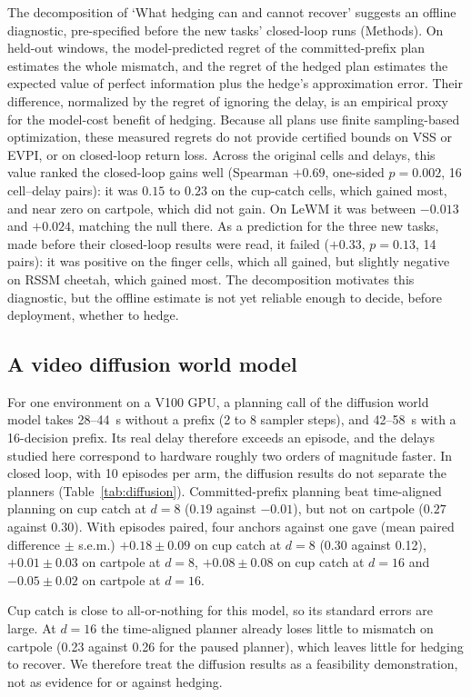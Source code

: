 \documentclass[aps,physrev,\manuscriptlayout,superscriptaddress,
  longbibliography,amsmath,amssymb]{revtex4-2}
\begin{document}
The decomposition of `What hedging can and cannot recover' suggests an offline diagnostic, pre-specified before the new tasks' closed-loop runs (Methods). On held-out windows, the model-predicted regret of the committed-prefix plan estimates the whole mismatch, and the regret of the hedged plan estimates the expected value of perfect information plus the hedge's approximation error. Their difference, normalized by the regret of ignoring the delay, is an empirical proxy for the model-cost benefit of hedging. Because all plans use finite sampling-based optimization, these measured regrets do not provide certified bounds on VSS or EVPI, or on closed-loop return loss. Across the original cells and delays, this value ranked the closed-loop gains well (Spearman $+0.69$, one-sided $p=0.002$, 16 cell--delay pairs): it was $0.15$ to $0.23$ on the cup-catch cells, which gained most, and near zero on cartpole, which did not gain. On LeWM it was between $-0.013$ and $+0.024$, matching the null there. As a prediction for the three new tasks, made before their closed-loop results were read, it failed ($+0.33$, $p=0.13$, 14 pairs): it was positive on the finger cells, which all gained, but slightly negative on RSSM cheetah, which gained most. The decomposition motivates this diagnostic, but the offline estimate is not yet reliable enough to decide, before deployment, whether to hedge.

\subsection{A video diffusion world model}\label{sec:diffusion}

For one environment on a V100 GPU, a planning call of the diffusion world model takes 28--44~s without a prefix (2 to 8 sampler steps), and 42--58~s with a 16-decision prefix. Its real delay therefore exceeds an episode, and the delays studied here correspond to hardware roughly two orders of magnitude faster. In closed loop, with 10 episodes per arm, the diffusion results do not separate the planners (Table~\ref{tab:diffusion}). Committed-prefix planning beat time-aligned planning on cup catch at $d=8$ ($0.19$ against $-0.01$), but not on cartpole ($0.27$ against $0.30$). With episodes paired, four anchors against one gave (mean paired difference $\pm$ s.e.m.) $+0.18\pm0.09$ on cup catch at $d=8$ (0.30 against 0.12), $+0.01\pm0.03$ on cartpole at $d=8$, $+0.08\pm0.08$ on cup catch at $d=16$ and $-0.05\pm0.02$ on cartpole at $d=16$.

Cup catch is close to all-or-nothing for this model, so its standard errors are large. At $d=16$ the time-aligned planner already loses little to mismatch on cartpole (0.23 against 0.26 for the paused planner), which leaves little for hedging to recover. We therefore treat the diffusion results as a feasibility demonstration, not as evidence for or against hedging.
\end{document}
